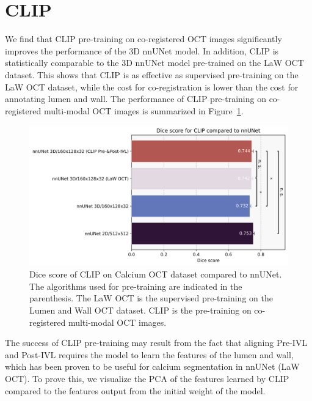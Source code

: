 \documentclass[a4paper,11pt,oneside]{report}
\begin{document}
\section{CLIP}
We find that CLIP pre-training on co-registered OCT images significantly improves the performance of the 3D nnUNet model. In addition, CLIP is statistically comparable to the 3D nnUNet model pre-trained on the LaW OCT dataset. This shows that CLIP is as effective as supervised pre-training on the LaW OCT dataset, while the cost for co-registration is lower than the cost for annotating lumen and wall. The performance of CLIP pre-training on co-registered multi-modal OCT images is summarized in Figure~\ref{fig:clip-results}.

\begin{figure}[h]
    \centering
    \includegraphics[width=0.65\linewidth]{figures/result_nnUNet_and_CLIP_results.png}
    \caption{Dice score of CLIP on Calcium OCT dataset compared to nnUNet. The algorithms used for pre-training are indicated in the parenthesis. The LaW OCT is the supervised pre-training on the Lumen and Wall OCT dataset. CLIP is the pre-training on co-registered multi-modal OCT images.
    }
    \label{fig:clip-results}
\end{figure}

The success of CLIP pre-training may result from the fact that aligning Pre-IVL and Post-IVL requires the model to learn the features of the lumen and wall, which has been proven to be useful for calcium segmentation in nnUNet (LaW OCT). To prove this, we visualize the PCA of the features learned by CLIP compared to the features output from the initial weight of the model. 
\end{document}
